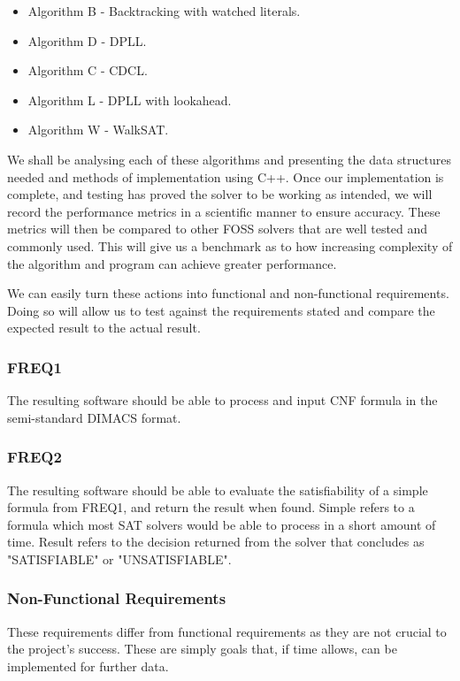 \documentclass{article}
\begin{document}
\begin{itemize}
    \item Algorithm B - Backtracking with watched literals.
    \item Algorithm D - DPLL.
    \item Algorithm C - CDCL.
    \item Algorithm L - DPLL with lookahead.
    \item Algorithm W - WalkSAT.
\end{itemize}

We shall be analysing each of these algorithms and presenting the data structures needed and methods of implementation using C++. Once our implementation is complete, and testing has proved the solver to be working as intended, we will record the performance metrics in a scientific manner to ensure accuracy. These metrics will then be compared to other FOSS solvers that are well tested and commonly used. This will give us a benchmark as to how increasing complexity of the algorithm and program can achieve greater performance. 

We can easily turn these actions into functional and non-functional requirements. Doing so will allow us to test against the requirements stated and compare the expected result to the actual result.

\subsubsection{FREQ1}
The resulting software should be able to process and input CNF formula in the semi-standard DIMACS format.

\subsubsection{FREQ2}
The resulting software should be able to evaluate the satisfiability of a simple formula from FREQ1, and return the result when found. Simple refers to a formula which most SAT solvers would be able to process in a short amount of time. Result refers to the decision returned from the solver that concludes as "SATISFIABLE" or "UNSATISFIABLE".

\subsubsection{Non-Functional Requirements}
These requirements differ from functional requirements as they are not crucial to the project's success. These are simply goals that, if time allows, can be implemented for further data.
\end{document}
